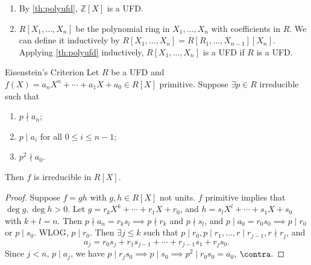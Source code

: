 \begin{example}
    \leavevmode
    \begin{enumerate}
        \item By \cref{th:polyufd}, \(\mathbb{Z}[X]\) is a UFD.
        \item \(R[X_1, \ldots, X_n]\) be the polynomial ring in \(X_1, \ldots, X_n\) with coefficients in \(R\). We can define it inductively by \(R[X_1, \ldots, X_n] = R[R_1, \ldots, X_{n-1}][X_n]\). Applying \cref{th:polyufd} inductively, \(R[X_1, \ldots, X_n]\) is a UFD if \(R\) is a UFD.
    \end{enumerate}
\end{example}
\begin{theorem}{Eisenstein's Criterion}{}
    Let \(R\) be a UFD and \(f(X) = a_n X^n + \cdots + a_1 X + a_0 \in R[X]\) primitive. Suppose \(\exists p \in R\) irreducible such that
    \begin{enumerate}
        \item \(p \nmid a_n\);
        \item \(p \mid a_i\) for all \(0 \leq i \leq n - 1\);
        \item \(p^2 \nmid a_0\).
    \end{enumerate}
    Then \(f\) is irreducible in \(R[X]\).
\end{theorem}
\begin{proof}
    Suppose \(f = gh\) with \(g, h \in R[X]\) not units. \(f\) primitive implies that \(\deg g, \deg h > 0\). Let \(g = r_k X^k + \cdots + r_1 X + r_0\), and \(h = s_l X^l + \cdots + s_1 X + s_0\) with \(k + l = n\). Then \(p \nmid a_n = r_k s_l \implies p \nmid r_k\) and \(p \nmid s_l\), and \(p \mid a_0 = r_0 s_0\implies p \mid r_0\) or \(p \mid s_0\). WLOG, \(p \mid r_0\). Then \(\exists j \leq k\) such that \(p \mid r_0, p \mid r_1, \ldots, r\mid r_{j-1}, r\nmid r_j\), and
    \[
        a_j = r_0 s_j + r_1 s_{j-1} + \cdots + r_{j-1}s_1 + r_j s_0.
    \]
    Since \(j < n\), \(p\mid a_j\), we have \(p \mid r_j s_0 \implies p \mid s_0 \implies p^2 \mid r_0 s_0 = a_0\), \(\contra\).
\end{proof}
